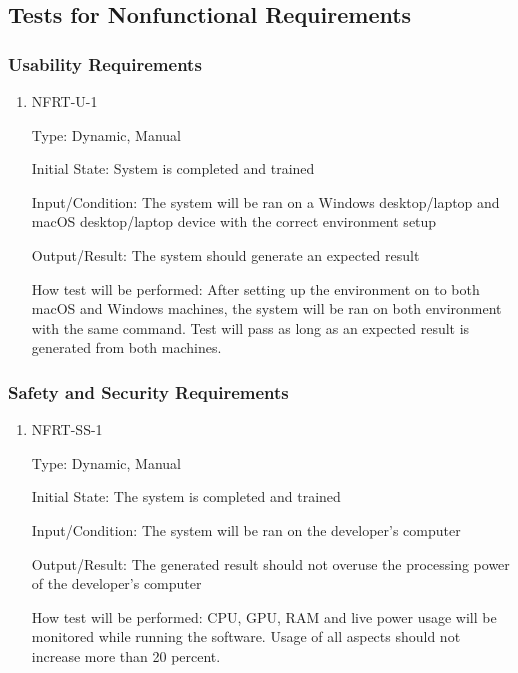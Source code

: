 \documentclass[12pt, titlepage]{article}
\begin{document}
\subsection{Tests for Nonfunctional Requirements}
\subsubsection{Usability Requirements}
		

\begin{enumerate}

\item{NFRT-U-1\\}

Type: Dynamic, Manual
					
Initial State: System is completed and trained
					
Input/Condition: The system will be ran on a Windows desktop/laptop and macOS desktop/laptop device with the correct environment setup
					
Output/Result: The system should generate an expected result 
					
How test will be performed: After setting up the environment on to both macOS and Windows machines, the system will be ran on both environment with the same command. Test will pass as long as an expected result is generated from both machines.


\end{enumerate}


\subsubsection{Safety and Security Requirements}


\begin{enumerate}

\item{NFRT-SS-1\\}

Type: Dynamic, Manual
					
Initial State: The system is completed and trained 
					
Input/Condition: The system will be ran on the developer's computer
					
Output/Result: The generated result should not overuse the processing power of the developer's computer
					
How test will be performed: CPU, GPU, RAM and live power usage will be monitored while running the software. Usage of all aspects should not increase more than 20 percent.   
					
\end{enumerate}
\end{document}
